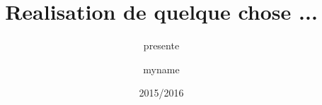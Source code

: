 \documentclass[11pt]{beamer}
\title[title for footline]{Realisation de quelque chose ...}
\subtitle{presente}
\author[name for footline]{myname}
\date[date for footline]{2015/2016}
\begin{document}
    \begin{frame}
        \titlepage
    \end{frame} 
\end{document}
